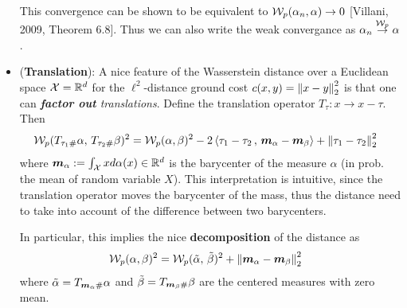 \documentclass[11pt]{article}
\begin{document}
\begin{itemize}
\begin{definition}
This convergence can be shown to be equivalent to ${\mathcal W}_{p}(\alpha_{n}, \alpha) \rightarrow 0$ [Villani, 2009, Theorem 6.8]. Thus we can also write the weak convergance as $\alpha_{n}\stackrel{{\mathcal W}_{p}}{\rightarrow} \alpha$.
\end{definition}


\item (\textbf{Translation}): A nice feature of the Wasserstein distance over a Euclidean space ${\mathcal X} = {\mathbb R}^d$ for the $\ell^2$-distance ground cost $c(x, y) = \left\|x - y\right\|_{2}^2$ is that one can \emph{\textbf{factor out} translations}. Define the translation operator $T_{\tau}: x \rightarrow x-\tau$. Then 
\begin{align}
{\mathcal W}_{p}(T_{\tau_1 \#}\alpha, \,T_{\tau_{2} \#} \beta)^2 &= {\mathcal W}_{p}(\alpha, \beta)^2 -2 \left\langle \tau_1 - \tau_{2}\,,\, \boldsymbol{m}_{\alpha} - \boldsymbol{m}_{\beta} \right\rangle + \left\|\tau_1 - \tau_{2}\right\|_{2}^2 \label{eqn: translation_wasserstein_dis}
\end{align} where $\boldsymbol{m}_{\alpha} := \int_{{\mathcal X}} x d\alpha(x) \in {\mathbb R}^{d}$ is the barycenter of  the measure $\alpha$ (in prob. the mean of random variable $X$). This interpretation is intuitive, since the translation operator moves the barycenter of the mass, thus the distance need to take into account of the difference between two barycenters. 

In particular, this implies the nice \textbf{decomposition} of the distance as
\begin{align}
{\mathcal W}_{p}(\alpha, \beta)^2 &= {\mathcal W}_{p}(\tilde{\alpha}, \,\tilde{\beta})^2  + \left\|\boldsymbol{m}_{\alpha} - \boldsymbol{m}_{\beta}\right\|_{2}^2 \label{eqn: translation_wasserstein_dis2}
\end{align} where $\tilde{\alpha} = T_{\boldsymbol{m}_{\alpha} \#}\alpha$ and $\tilde{\beta} = T_{\boldsymbol{m}_{\beta} \#}\beta$ are the centered measures with zero mean.
\end{itemize}
\end{document}
